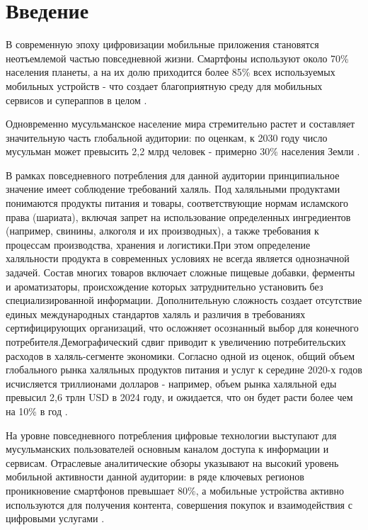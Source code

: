 \chapter*{Введение}\label{ch:intro}


В современную эпоху цифровизации мобильные приложения становятся неотъемлемой частью повседневной жизни. Смартфоны используют около 70\% населения планеты, а на их долю приходится более 85\% всех используемых мобильных устройств - что создает благоприятную среду для мобильных сервисов и супераппов в целом \cite{ref1}.


Одновременно мусульманское население мира стремительно растет и составляет значительную часть глобальной аудитории: по оценкам, к 2030 году число мусульман может превысить 2,2 млрд человек - примерно 30\% населения Земли \cite{ref2}.


В рамках повседневного потребления для данной аудитории принципиальное значение имеет соблюдение требований халяль. Под халяльными продуктами понимаются продукты питания и товары, соответствующие нормам исламского права (шариата), включая запрет на использование определенных ингредиентов (например, свинины, алкоголя и их производных), а также требования к процессам производства, хранения и логистики.При этом определение халяльности продукта в современных условиях не всегда является однозначной задачей. Состав многих товаров включает сложные пищевые добавки, ферменты и ароматизаторы, происхождение которых затруднительно установить без специализированной информации. Дополнительную сложность создает отсутствие единых международных стандартов халяль и различия в требованиях сертифицирующих организаций, что осложняет осознанный выбор для конечного потребителя.Демографический сдвиг приводит к увеличению потребительских расходов в халяль-сегменте экономики. Согласно одной из оценок, общий объем глобального рынка халяльных продуктов питания и услуг к середине 2020-х годов исчисляется триллионами долларов - например, объем рынка халяльной еды превысил 2,6 трлн USD в 2024 году, и ожидается, что он будет расти более чем на 10\% в год \cite{ref3}.


На уровне повседневного потребления цифровые технологии выступают для мусульманских пользователей основным каналом доступа к информации и сервисам. Отраслевые аналитические обзоры указывают на высокий уровень мобильной активности данной аудитории: в ряде ключевых регионов проникновение смартфонов превышает 80\%, а мобильные устройства активно используются для получения контента, совершения покупок и взаимодействия с цифровыми услугами \cite{ref6}.


